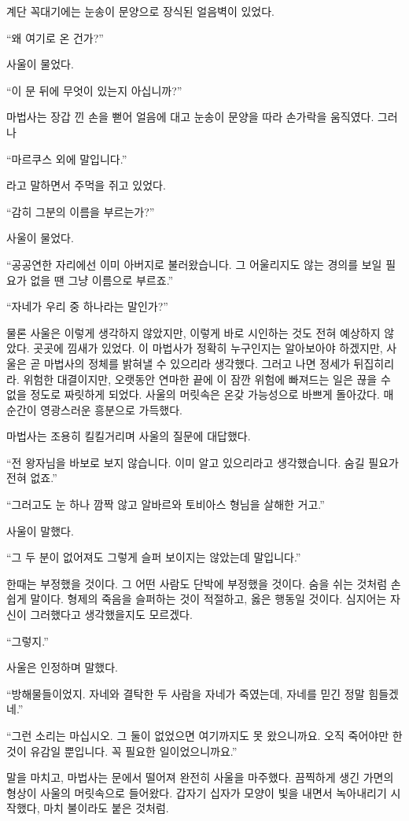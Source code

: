 계단 꼭대기에는 눈송이 문양으로 장식된 얼음벽이 있었다.

``왜 여기로 온 건가?''

사울이 물었다.

``이 문 뒤에 무엇이 있는지 아십니까?''

마법사는 장갑 낀 손을 뻗어 얼음에 대고 눈송이 문양을 따라 손가락을 움직였다. 그러나

``마르쿠스 외에 말입니다.''

라고 말하면서 주먹을 쥐고 있었다.

``감히 그분의 이름을 부르는가?''

사울이 물었다.

``공공연한 자리에선 이미 아버지로 불러왔습니다. 그 어울리지도 않는 경의를 보일 필요가 없을 땐 그냥 이름으로 부르죠.''

``자네가 우리 중 하나라는 말인가?''

물론 사울은 이렇게 생각하지 않았지만, 이렇게 바로 시인하는 것도 전혀 예상하지 않았다. 곳곳에 낌새가 있었다. 이 마법사가 정확히 누구인지는 알아보아야 하겠지만, 사울은 곧 마법사의 정체를 밝혀낼 수 있으리라 생각했다. 그러고 나면 정세가 뒤집히리라. 위험한 대결이지만, 오랫동안 연마한 끝에 이 잠깐 위험에 빠져드는 일은 끊을 수 없을 정도로 짜릿하게 되었다. 사울의 머릿속은 온갖 가능성으로 바쁘게 돌아갔다. 매 순간이 영광스러운 흥분으로 가득했다.

마법사는 조용히 킬킬거리며 사울의 질문에 대답했다.

``전 왕자님을 바보로 보지 않습니다. 이미 알고 있으리라고 생각했습니다. 숨길 필요가 전혀 없죠.''

``그러고도 눈 하나 깜짝 않고 알바르와 토비아스 형님을 살해한 거고.''

사울이 말했다.

``그 두 분이 없어져도 그렇게 슬퍼 보이지는 않았는데 말입니다.''

한때는 부정했을 것이다. 그 어떤 사람도 단박에 부정했을 것이다. 숨을 쉬는 것처럼 손쉽게 말이다. 형제의 죽음을 슬퍼하는 것이 적절하고, 옳은 행동일 것이다. 심지어는 자신이 그러했다고 생각했을지도 모르겠다.

``그렇지.''

사울은 인정하며 말했다.

``방해물들이었지. 자네와 결탁한 두 사람을 자네가 죽였는데, 자네를 믿긴 정말 힘들겠네.''

``그런 소리는 마십시오. 그 둘이 없었으면 여기까지도 못 왔으니까요. 오직 죽어야만 한 것이 유감일 뿐입니다. 꼭 필요한 일이었으니까요.''

말을 마치고, 마법사는 문에서 떨어져 완전히 사울을 마주했다. 끔찍하게 생긴 가면의 형상이 사울의 머릿속으로 들어왔다. 갑자기 십자가 모양이 빛을 내면서 녹아내리기 시작했다, 마치 불이라도 붙은 것처럼.

